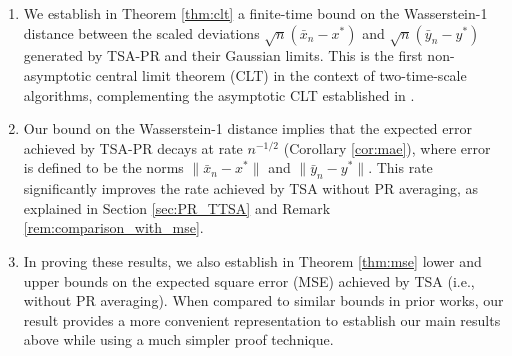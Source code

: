\begin{enumerate}
    \item 
    We establish in Theorem \ref{thm:clt} a finite-time bound on the Wasserstein-1 distance between the scaled deviations $\sqrt{n}(\bar{x}_n - x^*)$ and $\sqrt{n}(\bar{y}_n - y^*)$ generated by TSA-PR and their Gaussian limits. 
    This is the first non-asymptotic central limit theorem (CLT) in the context of two-time-scale algorithms, complementing the asymptotic CLT established in \citep{mokkadem2006convergence}. 
    \vspace{-0.3cm}
 
    \item Our bound on the Wasserstein-1 distance implies that the expected error achieved by TSA-PR decays at rate $n^{-1/2}$ (Corollary \ref{cor:mae}), where error is defined to be the norms $\lVert \bar{x}_n - x^* \rVert$ and $\lVert \bar{y}_n - y^*\rVert$. 
    This rate significantly improves the rate achieved by TSA without PR averaging, as explained in Section \ref{sec:PR_TTSA} and Remark \ref{rem:comparison_with_mse}.\vspace{-0.3cm}

    \item In proving these results, we also establish in Theorem \ref{thm:mse} lower and upper bounds on the expected square error (MSE) achieved by TSA (i.e., without PR averaging). 
    When compared to similar bounds in prior works, our result provides a more convenient representation to establish our main results above while using a much simpler proof technique.      
    \vspace{-0.3cm}
    
\end{enumerate}








